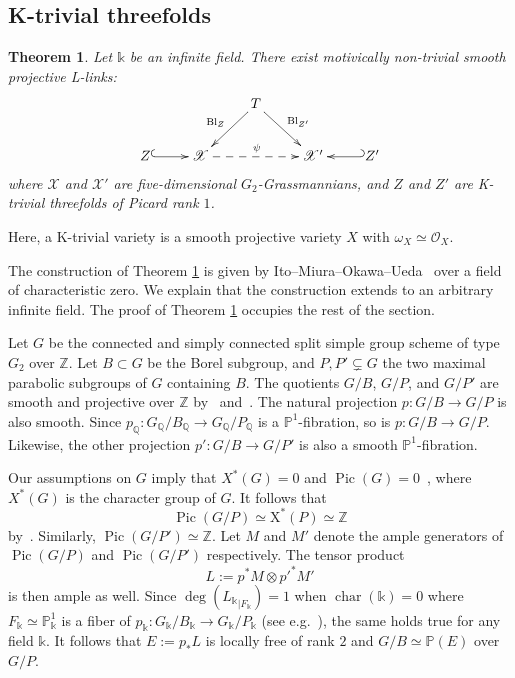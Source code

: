\documentclass[a4paper,12pt]{amsart}
\def\k{\mathbb k}
\def\P{\mathbb P}
\def\Q{\mathbb Q}
\def\Z{\mathbb Z}
\def\XX{\mathcal X}
\def\chr{{\operatorname{char}}}
\def\Pic{{\operatorname{Pic}}}
\def\Bl{{\operatorname{Bl}}}
\def\chr{{\operatorname{char}}}
\theoremstyle{plain}
\newtheorem{theorem}[dummy]{Theorem}
\numberwithin{equation}{section}
\theoremstyle{definition}
\newcommand{\cO}{\mathcal{O}}
\newcommand{\go}{\omega}
\newcommand{\X}{\mathrm{X}}
\newcommand{\cnec}{\mathrel{:=}}
\renewcommand{\(}{\left(}
\renewcommand{\)}{\right)}
\begin{document}
\subsection{K-trivial
threefolds}\label{ssec-IMOU}
\hfill

\begin{theorem}\label{thm:CY3}
Let $\k$ be an infinite field.
There exist motivically non-trivial smooth projective L-links:
\begin{equation}\label{eq:L-link-CY3}
 \xymatrix{
    & & T \ar[dl]_{\Bl_{Z}} \ar[dr]^{\Bl_{Z'}} & & \\
    Z \ar@{^{(}->}[r] & \XX \ar@{-->}[rr]^\psi &  & \XX' & \ar@{_{(}->}[l] Z'\\
}
\end{equation}
where $\XX$ and $\XX'$ are five-dimensional
$G_2$-Grassmannians, and
$Z$ and $Z'$ are 
K-trivial
threefolds
of Picard rank $1$.
\end{theorem}

Here, a K-trivial variety is a smooth projective variety $X$
with $\go_X \simeq \cO_X$.

\medskip

The construction of Theorem \ref{thm:CY3}
is given by Ito--Miura--Okawa--Ueda~\cite{IMOUG2} 
over a field of characteristic zero. 
We explain that the construction extends
to an arbitrary infinite field.
The proof of Theorem \ref{thm:CY3} occupies
the rest of the section.

Let $G$ be the connected and simply connected 
split simple group scheme of type $G_2$ over $\Z$.
Let $B \subset G$
be the Borel subgroup, and
$P,P' \subsetneq G$ 
the two maximal parabolic subgroups of $G$ containing $B$.
The quotients $G/B$, $G/P$, and $G/P'$ 
are smooth and projective over $\Z$ 
by~\cite[Theorem 13.33]{MilneAlgGp} 
and~\cite[Corollary XXII.5.8.5]{SGA3}.
The natural projection $p : G/B \to G/P$
is also smooth. 
Since $p_\Q : G_\Q/B_\Q \to G_\Q/P_\Q$
is a $\P^1$-fibration, so is $p : G/B \to G/P$.
Likewise, the other projection
$p' : G/B \to G/P'$ is also a smooth $\P^1$-fibration.

Our assumptions on $G$ imply that
$X^*(G) = 0$ and 
$\Pic(G) = 0$~\cite[Remark VII.1.7.a)]{RaynaudAmple},
where $X^*(G)$ is the character group of $G$.
It follows that
$$\Pic(G/P) \simeq \X^*(P) \simeq \Z$$
by~\cite[Proposition VII.1.5]{RaynaudAmple}.
Similarly, $\Pic(G/P') \simeq \Z$.
Let $M$ and $M'$ 
denote the ample generators of $\Pic(G/P)$ and $\Pic(G/P')$
respectively.
The tensor product 
$$L \cnec p^*M \otimes p'^*M'$$
is then ample as well.
Since $\deg({L_\k}_{|F_\k}) = 1$ when $\chr(\k) = 0$
where $F_\k \simeq \P^1_\k$ is a fiber of $p_\k : G_\k/B_\k \to G_\k/P_\k$
(see e.g.~\cite{IMOUG2}),
the same holds true for any field $\k$.
It follows that 
$E \cnec p_*L$ is locally free of rank $2$ and
$G/B \simeq \P(E)$ over $G/P$.
\end{document}
